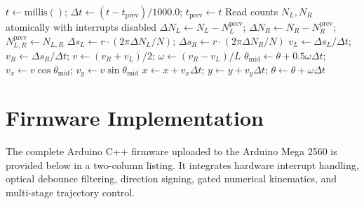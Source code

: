 \documentclass[11pt,a4paper]{article}
\begin{document}
\vspace{0.08cm}
\begin{algorithm}[H]
\small
\SetAlFnt{\small}
\SetAlCapFnt{\small}
\SetAlCapNameFnt{\small}
\setlength{\algomargin}{0.8em}
\DontPrintSemicolon
\caption{Gated odometry and kinematic integration routine (\texttt{UpdateOdometry})}
\label{algo_odom}
$t \leftarrow \text{millis}()$; \quad {}
$\Delta t \leftarrow (t - t_{\text{prev}})/1000.0$; \quad $t_{\text{prev}} \leftarrow t$\;
Read counts $N_L, N_R$ atomically with interrupts disabled\;
$\Delta N_L \leftarrow N_L - N_L^{\text{prev}}$; \quad $\Delta N_R \leftarrow N_R - N_R^{\text{prev}}$; \quad $N_{L,R}^{\text{prev}} \leftarrow N_{L,R}$\;
$\Delta s_L \leftarrow r \cdot (2\pi \Delta N_L / N)$; \quad $\Delta s_R \leftarrow r \cdot (2\pi \Delta N_R / N)$\;
$v_L \leftarrow \Delta s_L / \Delta t$; \quad $v_R \leftarrow \Delta s_R / \Delta t$; \quad $v \leftarrow (v_R + v_L)/2$; \quad $\omega \leftarrow (v_R - v_L)/L$\;
$\theta_{\text{mid}} \leftarrow \theta + 0.5 \omega \Delta t$; \quad $v_x \leftarrow v \cos\theta_{\text{mid}}$; \quad $v_y \leftarrow v \sin\theta_{\text{mid}}$\;
$x \leftarrow x + v_x \Delta t$; \quad $y \leftarrow y + v_y \Delta t$; \quad $\theta \leftarrow \theta + \omega \Delta t$\;
\end{algorithm}

\newpage
\section{Firmware Implementation}
\noindent The complete Arduino C++ firmware uploaded to the Arduino Mega 2560 is provided below in a two-column listing. It integrates hardware interrupt handling, optical debounce filtering, direction signing, gated numerical kinematics, and multi-stage trajectory control.
\end{document}
